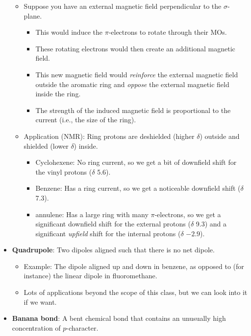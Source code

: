 \documentclass[../notes.tex]{subfiles}
\begin{document}
\begin{itemize}
\begin{figure}[h!]
        \label{fig:ringCurrent}
    \end{figure}
    \begin{itemize}
        \item Suppose you have an external magnetic field perpendicular to the $\sigma$-plane.
        \begin{itemize}
            \item This would induce the $\pi$-electrons to rotate through their MOs.
            \item These rotating electrons would then create an additional magnetic field.
            \item This new magnetic field would \emph{reinforce} the external magnetic field outside the aromatic ring and \emph{oppose} the external magnetic field inside the ring.
            \item The strength of the induced magnetic field is proportional to the current (i.e., the size of the ring).
        \end{itemize}
        \item Application (NMR): Ring protons are deshielded (higher $\delta$) outside and shielded (lower $\delta$) inside.
        \begin{itemize}
            \item Cyclohexene: No ring current, so we get a bit of downfield shift for the vinyl protons ($\delta$ 5.6).
            \item Benzene: Has a ring current, so we get a noticeable downfield shift ($\delta$ 7.3).
            \item\!\!\! [18]annulene: Has a large ring with many $\pi$-electrons, so we get a significant downfield shift for the external protons ($\delta$ 9.3) and a significant \emph{upfield} shift for the internal protons ($\delta$ $-2.9$).
        \end{itemize}
    \end{itemize}
    \item \textbf{Quadrupole}: Two dipoles aligned such that there is no net dipole.
    \begin{itemize}
        \item Example: The dipole aligned up and down in benzene, as opposed to (for instance) the linear dipole in fluoromethane.
        \item Lots of applications beyond the scope of this class, but we can look into it if we want.
    \end{itemize}
    \item \textbf{Banana bond}: A bent chemical bond that contains an unusually high concentration of $p$-character.

\end{itemize}
\end{document}

